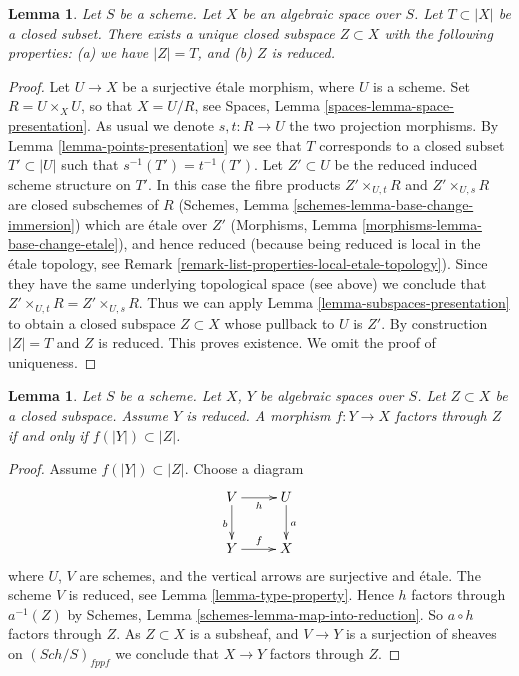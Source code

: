 \documentclass{stacks-project}
\theoremstyle{plain}
\newtheorem{lemma}[subsection]{Lemma}
\theoremstyle{definition}
\theoremstyle{remark}
\numberwithin{equation}{subsection}
\def\Sch{\mathit{Sch}}
\begin{document}
\begin{lemma}
\label{lemma-reduced-closed-subspace}
Let $S$ be a scheme.
Let $X$ be an algebraic space over $S$.
Let $T \subset |X|$ be a closed subset.
There exists a unique closed subspace $Z \subset X$ with
the following properties: (a) we have $|Z| = T$, and (b) $Z$ is reduced.
\end{lemma}

\begin{proof}
Let $U \to X$ be a surjective \'etale morphism, where $U$ is a scheme.
Set $R = U \times_X U$, so that $X = U/R$, see
Spaces, Lemma \ref{spaces-lemma-space-presentation}.
As usual we denote $s, t : R \to U$ the two projection morphisms.
By Lemma \ref{lemma-points-presentation}
we see that $T$ corresponds to a closed subset $T' \subset |U|$ such
that $s^{-1}(T') = t^{-1}(T')$.
Let $Z' \subset U$ be the reduced induced scheme structure on $T'$.
In this case the fibre products
$Z' \times_{U, t} R$ and $Z' \times_{U, s} R$ are closed subschemes
of $R$
(Schemes, Lemma \ref{schemes-lemma-base-change-immersion})
which are \'etale over $Z'$
(Morphisms, Lemma \ref{morphisms-lemma-base-change-etale}),
and hence reduced
(because being reduced is local in the \'etale topology, see
Remark \ref{remark-list-properties-local-etale-topology}).
Since they have the same underlying topological space (see above)
we conclude that $Z' \times_{U, t} R = Z' \times_{U, s} R$.
Thus we can apply Lemma \ref{lemma-subspaces-presentation}
to obtain a closed subspace $Z \subset X$ whose pullback to $U$ is $Z'$.
By construction $|Z| = T$ and $Z$ is reduced. This proves existence.
We omit the proof of uniqueness.
\end{proof}

\begin{lemma}
\label{lemma-map-into-reduction}
Let $S$ be a scheme.
Let $X$, $Y$ be algebraic spaces over $S$.
Let $Z \subset X$ be a closed subspace.
Assume $Y$ is reduced.
A morphism $f : Y \to X$ factors through $Z$ if and only if
$f(|Y|) \subset |Z|$.
\end{lemma}

\begin{proof}
Assume $f(|Y|) \subset |Z|$. Choose a diagram
$$
\xymatrix{
V \ar[d]_b \ar[r]_h & U \ar[d]^a \\
Y \ar[r]^f & X
}
$$
where $U$, $V$ are schemes, and the vertical arrows are surjective and
\'etale. The scheme $V$ is reduced, see
Lemma \ref{lemma-type-property}.
Hence $h$ factors through $a^{-1}(Z)$ by
Schemes, Lemma \ref{schemes-lemma-map-into-reduction}.
So $a \circ h$ factors through $Z$.
As $Z \subset X$ is a subsheaf, and $V \to Y$ is a surjection of sheaves
on $(\Sch/S)_{fppf}$ we conclude that $X \to Y$ factors
through $Z$.
\end{proof}
\end{document}
